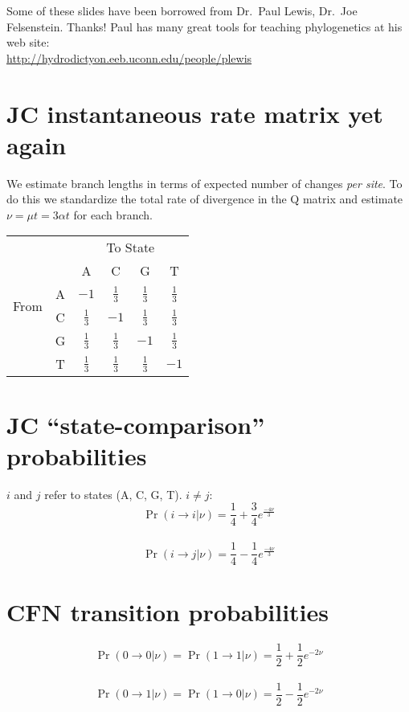 \documentclass[landscape]{foils}
\begin{document}
\pagecolor{white}
\unitlength=1mm
\begin{center}
{\Large Some of these slides have been borrowed from Dr.\ Paul Lewis, Dr.\ Joe Felsenstein. Thanks!}
\vskip 15mm
\large Paul has many great tools for teaching phylogenetics at his web site: \\
\url{http://hydrodictyon.eeb.uconn.edu/people/plewis}
\end{center}


\myNewSlide
\section*{JC instantaneous rate matrix yet again}
\Large
We estimate branch lengths in terms of expected number of changes {\em per site}.
To do this we standardize the total rate of divergence in the Q matrix and estimate $\nu = \mu t = 3\alpha t$
for each branch.


\begin{table}[htdp]
\begin{center}
\begin{tabular}{cc|cccc}
& & \multicolumn{4}{c}{To State} \\
& & A & C & G & T \\
\hline
\multirow{2}{*}{From } & A &  $-1$ & $\frac{1}{3}$ & $\frac{1}{3}$ & $\frac{1}{3}$    \\
\multirow{2}{*}{State } &C & $\frac{1}{3}$ & $-1$ & $\frac{1}{3}$ & $\frac{1}{3}$    \\
 &G & $\frac{1}{3}$ & $\frac{1}{3}$ & $-1$ & $\frac{1}{3}$    \\
 &T & $\frac{1}{3}$ & $\frac{1}{3}$ & $\frac{1}{3}$ & $-1$    \\
\end{tabular}
\end{center}
\end{table}

\myNewSlide
\section*{JC ``state-comparison'' probabilities}
$i$ and $j$ refer to states (A, C, G, T). $i\neq j$:
$$\Pr(i\rightarrow i|\nu) = \frac{1}{4} + \frac{3}{4}e^{\frac{-4\nu}{3}}$$\\
$$\Pr(i\rightarrow j|\nu) = \frac{1}{4} - \frac{1}{4}e^{\frac{-4\nu}{3}}$$

\myNewSlide
\section*{CFN transition probabilities}
$$\Pr(0\rightarrow 0|\nu) = \Pr(1\rightarrow 1|\nu) = \frac{1}{2} + \frac{1}{2}e^{-2\nu}$$\\
$$\Pr(0\rightarrow 1|\nu) = \Pr(1\rightarrow 0|\nu) = \frac{1}{2} - \frac{1}{2}e^{-2\nu}$$
\end{document}
